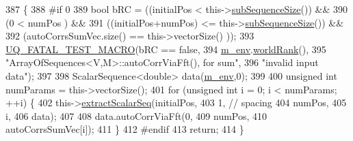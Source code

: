 \begin{DoxyCode}
387 \{
388 \textcolor{preprocessor}{#if 0}
389 \textcolor{preprocessor}{}  \textcolor{keywordtype}{bool} bRC = ((initialPos             <  this->\hyperlink{class_q_u_e_s_o_1_1_array_of_sequences_a007d00d2398007b9bac82ed23eedb1e2}{subSequenceSize}()) &&
390               (0                      <  numPos                 ) &&
391               ((initialPos+numPos)    <= this->\hyperlink{class_q_u_e_s_o_1_1_array_of_sequences_a007d00d2398007b9bac82ed23eedb1e2}{subSequenceSize}()) &&
392               (autoCorrsSumVec.size() == this->vectorSize()     ));
393   \hyperlink{_defines_8h_a56d63d18d0a6d45757de47fcc06f574d}{UQ\_FATAL\_TEST\_MACRO}(bRC == \textcolor{keyword}{false},
394                       \hyperlink{class_q_u_e_s_o_1_1_base_vector_sequence_a8e8824d2a63c5a43bcc6473e3a0491e8}{m\_env}.\hyperlink{class_q_u_e_s_o_1_1_base_environment_a78b57112bbd0e6dd0e8afec00b40ffa7}{worldRank}(),
395                       \textcolor{stringliteral}{"ArrayOfSequences<V,M>::autoCorrViaFft(), for sum"},
396                       \textcolor{stringliteral}{"invalid input data"});
397 
398   ScalarSequence<double> data(\hyperlink{class_q_u_e_s_o_1_1_base_vector_sequence_a8e8824d2a63c5a43bcc6473e3a0491e8}{m\_env},0);
399 
400   \textcolor{keywordtype}{unsigned} \textcolor{keywordtype}{int} numParams = this->vectorSize();
401   \textcolor{keywordflow}{for} (\textcolor{keywordtype}{unsigned} \textcolor{keywordtype}{int} i = 0; i < numParams; ++i) \{
402     this->\hyperlink{class_q_u_e_s_o_1_1_array_of_sequences_ab529b77aca8e169b1b769051e7de8c3d}{extractScalarSeq}(initialPos,
403                            1, \textcolor{comment}{// spacing}
404                            numPos,
405                            i,
406                            data);
407 
408     data.autoCorrViaFft(0,
409                         numPos,
410                         autoCorrsSumVec[i]);
411   \}
412 \textcolor{preprocessor}{#endif}
413 \textcolor{preprocessor}{}  \textcolor{keywordflow}{return};
414 \}
\end{DoxyCode}
